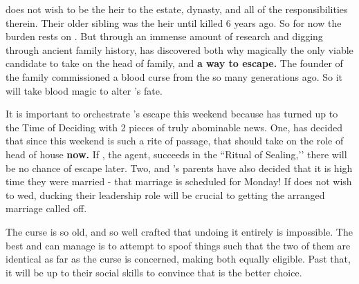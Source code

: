 \documentclass[green]{GL2020}
\begin{document}
\name{\gFaledonHeir{}}

\cHeir{\full} does not wish to be the heir to the \cFaledonParent{\Formal} estate, dynasty, and all of the responsibilities therein. Their older sibling \cHeirSibling{\full} was the heir until \cHeirSibling{\they} \cHeirSibling{\were} killed 6 years ago. So for now the burden rests on \cHeir{}. But through an immense amount of research and digging through ancient family history, \cHeir{} has discovered both why \cHeir{\theyare} magically the only viable candidate to take on the head of family, and \textbf{a way to escape.} The founder of the \cFaledonParent{\Formal} family commissioned a blood curse from the \pFarm{} so many generations ago. So it will take blood magic to alter \cHeir{}’s fate. 

It is important to orchestrate \cHeir{}’s escape this weekend because \cDiplomat{\full} has turned up to the Time of Deciding with 2 pieces of truly abominable news. One, \cFaledonParent{\full} has decided that since this weekend is such a rite of passage, that \cHeir{} should take on the role of head of house \textbf{now.} If \cDiplomat{}, the \cFaledonParent{\Formal} agent, succeeds in the ``Ritual of Sealing,’’ there will be no chance of escape later. Two, \cHeir{} and \cChupStudent{\full}’s parents have also decided that it is high time they were married - that marriage is scheduled for Monday! If \cHeir{} does not wish to wed, ducking their leadership role will be crucial to getting the arranged marriage called off.

The curse is so old, and so well crafted that undoing it entirely is impossible. The best \cHeir{} and \cAmbition{\full} can manage is to attempt to spoof things such that the two of them are identical as far as the curse is concerned, making both equally eligible. Past that, it will be up to their social skills to convince \cDiplomat{} that \cAmbition{} is the better choice.
\end{document}

